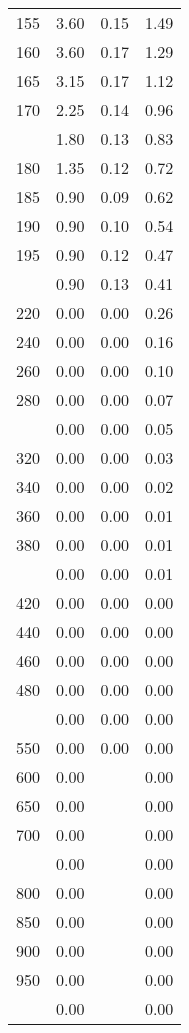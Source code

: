 \begin{table}[ht]
\begin{tabular}{lccc}
  155 & 3.60 & 0.15 & 1.49 \\ 
  160 & 3.60 & 0.17 & 1.29 \\ 
  165 & 3.15 & 0.17 & 1.12 \\ 
  170 & 2.25 & 0.14 & 0.96 \\ 
   \addlinespace
175 & 1.80 & 0.13 & 0.83 \\ 
  180 & 1.35 & 0.12 & 0.72 \\ 
  185 & 0.90 & 0.09 & 0.62 \\ 
  190 & 0.90 & 0.10 & 0.54 \\ 
  195 & 0.90 & 0.12 & 0.47 \\ 
   \addlinespace
200 & 0.90 & 0.13 & 0.41 \\ 
  220 & 0.00 & 0.00 & 0.26 \\ 
  240 & 0.00 & 0.00 & 0.16 \\ 
  260 & 0.00 & 0.00 & 0.10 \\ 
  280 & 0.00 & 0.00 & 0.07 \\ 
   \addlinespace
300 & 0.00 & 0.00 & 0.05 \\ 
  320 & 0.00 & 0.00 & 0.03 \\ 
  340 & 0.00 & 0.00 & 0.02 \\ 
  360 & 0.00 & 0.00 & 0.01 \\ 
  380 & 0.00 & 0.00 & 0.01 \\ 
   \addlinespace
400 & 0.00 & 0.00 & 0.01 \\ 
  420 & 0.00 & 0.00 & 0.00 \\ 
  440 & 0.00 & 0.00 & 0.00 \\ 
  460 & 0.00 & 0.00 & 0.00 \\ 
  480 & 0.00 & 0.00 & 0.00 \\ 
   \addlinespace
500 & 0.00 & 0.00 & 0.00 \\ 
  550 & 0.00 & 0.00 & 0.00 \\ 
  600 & 0.00 &  & 0.00 \\ 
  650 & 0.00 &  & 0.00 \\ 
  700 & 0.00 &  & 0.00 \\ 
   \addlinespace
750 & 0.00 &  & 0.00 \\ 
  800 & 0.00 &  & 0.00 \\ 
  850 & 0.00 &  & 0.00 \\ 
  900 & 0.00 &  & 0.00 \\ 
  950 & 0.00 &  & 0.00 \\ 
   \addlinespace
1000 & 0.00 &  & 0.00 \\ 
   \bottomrule
\end{tabular}
\end{table}
